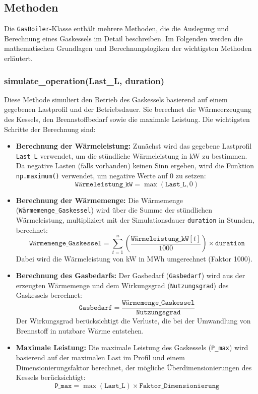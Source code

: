 \subsection{Methoden}
Die \texttt{GasBoiler}-Klasse enthält mehrere Methoden, die die Auslegung und Berechnung eines Gaskessels im Detail beschreiben. Im Folgenden werden die mathematischen Grundlagen und Berechnungslogiken der wichtigsten Methoden erläutert.

\subsubsection{simulate\_operation(Last\_L, duration)}
Diese Methode simuliert den Betrieb des Gaskessels basierend auf einem gegebenen Lastprofil und der Betriebsdauer. Sie berechnet die Wärmeerzeugung des Kessels, den Brennstoffbedarf sowie die maximale Leistung. Die wichtigsten Schritte der Berechnung sind:

\begin{itemize}
    \item \textbf{Berechnung der Wärmeleistung:} Zunächst wird das gegebene Lastprofil \texttt{Last\_L} verwendet, um die stündliche Wärmeleistung in kW zu bestimmen. Da negative Lasten (falls vorhanden) keinen Sinn ergeben, wird die Funktion \texttt{np.maximum()} verwendet, um negative Werte auf 0 zu setzen:
    \[
    \texttt{Wärmeleistung\_kW} = \max(\texttt{Last\_L}, 0)
    \]
    
    \item \textbf{Berechnung der Wärmemenge:} Die Wärmemenge (\texttt{Wärmemenge\_Gaskessel}) wird über die Summe der stündlichen Wärmeleistung, multipliziert mit der Simulationsdauer \texttt{duration} in Stunden, berechnet:
    \[
    \texttt{Wärmemenge\_Gaskessel} = \sum_{t=1}^{n} \left( \frac{\texttt{Wärmeleistung\_kW}[t]}{1000} \right) \times \texttt{duration}
    \]
    Dabei wird die Wärmeleistung von kW in MWh umgerechnet (Faktor 1000).

    \item \textbf{Berechnung des Gasbedarfs:} Der Gasbedarf (\texttt{Gasbedarf}) wird aus der erzeugten Wärmemenge und dem Wirkungsgrad (\texttt{Nutzungsgrad}) des Gaskessels berechnet:
    \[
    \texttt{Gasbedarf} = \frac{\texttt{Wärmemenge\_Gaskessel}}{\texttt{Nutzungsgrad}}
    \]
    Der Wirkungsgrad berücksichtigt die Verluste, die bei der Umwandlung von Brennstoff in nutzbare Wärme entstehen.

    \item \textbf{Maximale Leistung:} Die maximale Leistung des Gaskessels (\texttt{P\_max}) wird basierend auf der maximalen Last im Profil und einem Dimensionierungsfaktor berechnet, der mögliche Überdimensionierungen des Kessels berücksichtigt:
    \[
    \texttt{P\_max} = \max(\texttt{Last\_L}) \times \texttt{Faktor\_Dimensionierung}
    \]
\end{itemize}

